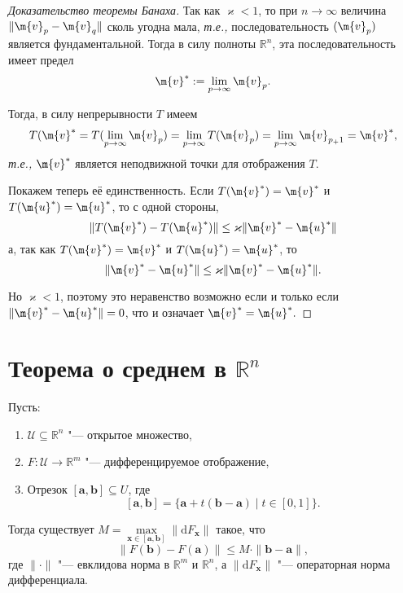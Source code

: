 \begin{proof}[Доказательство теоремы Банаха]
Так как $\varkappa<1$, то при $n\to \infty$ величина $\| \m{v}_p - \m{v}_q\|$ сколь угодна мала, \textit{т.е.,} последовательность $(\m{v}_p)$ является фундаментальной. Тогда в силу полноты $\mathbb{R}^n$, эта последовательность имеет предел
\[
 \m{v}^*: = \lim_{p\to \infty} \m{v}_p.
\]

Тогда, в силу непрерывности $T$ имеем
\[
 T(\m{v}^* = T(\lim_{p\to \infty} \m{v}_p) = \lim_{p\to \infty} T(\m{v}_p) = \lim_{p\to \infty} \m{v}_{p_+1} = \m{v}^*,
\]
\textit{т.е.,} $\m{v}^*$ является неподвижной точки для отображения $T.$

Покажем теперь её единственность. Если $T(\m{v}^*) = \m{v}^*$ и $T(\m{u}^*) = \m{u}^*$, то с одной стороны,
\[
 \| T(\m{v}^*) - T(\m{u}^*) \| \le  \varkappa \| \m{v}^* - \m{u}^* \|
\]
а, так как $T(\m{v}^*) = \m{v}^*$ и $T(\m{u}^*) = \m{u}^*$, то 
\[
 \| \m{v}^* - \m{u}^* \| \le \varkappa \| \m{v}^* - \m{u}^*\|.
\]

Но $\varkappa<1$, поэтому это неравенство возможно если и только если $ \| \m{v}^* - \m{u}^*\| = 0$, что и означает $ \m{v}^*= \m{u}^*.$
\end{proof}


\section{Теорема о среднем в $\mathbb{R}^n$}


\begin{theorem}
Пусть:
\begin{enumerate}
    \item $\mathscr{U} \subseteq \mathbb{R}^n$ "--- открытое множество,
    \item $F: \mathscr{U} \to \mathbb{R}^m$ "--- дифференцируемое отображение,
    \item Отрезок $[\mathbf{a}, \mathbf{b}] \subseteq U$, где
    \[
    [\mathbf{a}, \mathbf{b}] = \{ \mathbf{a} + t(\mathbf{b} - \mathbf{a}) \mid t \in [0, 1] \}.
    \]
\end{enumerate}
Тогда существует $M = \max\limits_{\mathbf{x} \in [\mathbf{a}, \mathbf{b}]} \| \mathrm{d}F_{\mathbf{x}} \|$ такое, что
\[
\| F(\mathbf{b}) - F(\mathbf{a}) \| \leqslant M \cdot \| \mathbf{b} - \mathbf{a} \|,
\]
где $\| \cdot \|$ "--- евклидова норма в $\mathbb{R}^m$ и $\mathbb{R}^n$, а $\| \mathrm{d}F_{\mathbf{x}} \|$ "--- операторная норма дифференциала.
\end{theorem}



